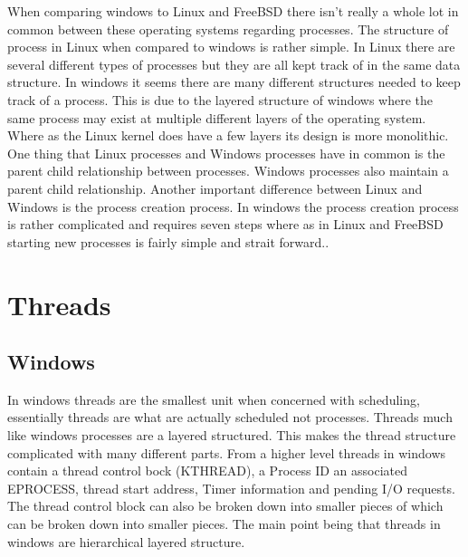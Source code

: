 \documentclass[letterpaper, onecolumn,10pt]{IEEEtran}
\begin{document}
			When comparing windows to Linux and FreeBSD there isn't really a whole lot in common between these operating systems regarding processes. The structure of process in Linux when compared to windows is rather simple. In Linux there are several different types of processes but they are all kept track of in the same data structure. In windows it seems there are many different structures needed to keep track of a process. This is due to the layered structure of windows where the same process may exist at multiple different layers of the operating system. Where as the Linux kernel does have a few layers its design is more monolithic. One thing that Linux processes and Windows processes have in common is the parent child relationship between processes. Windows processes also maintain a parent child relationship. Another important difference between Linux and Windows is the process creation process. In windows the process creation process is rather complicated and requires seven steps where as in Linux and FreeBSD starting new processes is fairly simple and strait forward.\cite{Windows}\cite{Linux}.\\
			
		\section{Threads}
			\subsection{Windows}
				In windows threads are the smallest unit when concerned with scheduling, essentially threads are what are actually scheduled not processes. Threads much like windows processes are a layered structured. This makes the thread structure complicated with many different parts. From a higher level threads in windows contain a thread control bock (KTHREAD), a Process ID an associated EPROCESS, thread start address, Timer information and pending I/O requests. The thread control block can also be broken down into smaller pieces of which can be broken down into smaller pieces. The main point being that threads in windows are hierarchical layered structure.\\
				
\end{document}
